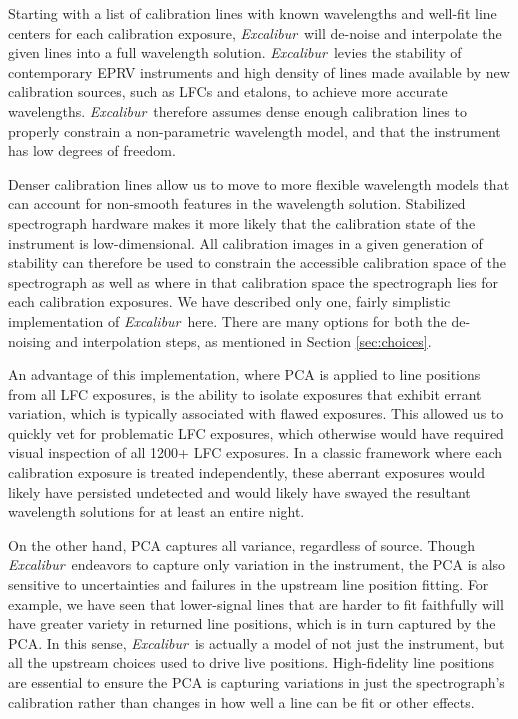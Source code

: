 \documentclass[modern]{aastex63}
\newcommand{\project}[1]{\textsl{#1}}
\newcommand{\name}{\project{Excalibur}}
\begin{document}
Starting with a list of calibration lines with known wavelengths and well-fit line centers for each calibration exposure, \name\ will de-noise and interpolate the given lines into a full wavelength solution.  \name\ levies the stability of contemporary EPRV instruments and high density of lines made available by new calibration sources, such as LFCs and etalons, to achieve more accurate wavelengths.  \name\ therefore assumes dense enough calibration lines to properly constrain a non-parametric wavelength model, and that the instrument has low degrees of freedom.

Denser calibration lines allow us to move to more flexible wavelength models that can account for non-smooth features in the wavelength solution.  Stabilized spectrograph hardware makes it more likely that the calibration state of the instrument is low-dimensional.  All calibration images in a given generation of stability can therefore be used to constrain the accessible calibration space of the spectrograph as well as where in that calibration space the spectrograph lies for each calibration exposures.  We have described only one, fairly simplistic implementation of \name\ here.  There are many options for both the de-noising and interpolation steps, as mentioned in Section \ref{sec:choices}.

An advantage of this implementation, where PCA is applied to line positions from all LFC exposures, is the ability to isolate exposures that exhibit errant variation, which is typically associated with flawed exposures.  This allowed us to quickly vet for problematic LFC exposures, which otherwise would have required visual inspection of all 1200+ LFC exposures.  In a classic framework where each calibration exposure is treated independently, these aberrant exposures would likely have persisted undetected and would likely have swayed the resultant wavelength solutions for at least an entire night.

On the other hand, PCA captures all variance, regardless of source.  Though \name\ endeavors to capture only variation in the instrument, the PCA is also sensitive to uncertainties and failures in the upstream line position fitting.  For example, we have seen that lower-signal lines that are harder to fit faithfully will have greater variety in returned line positions, which is in turn captured by the PCA.  In this sense, \name\ is actually a model of not just the instrument, but all the upstream choices used to drive live positions.  High-fidelity line positions are essential to ensure the PCA is capturing variations in just the spectrograph's calibration rather than changes in how well a line can be fit or other effects.
\end{document}
